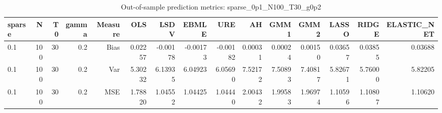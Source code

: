 \begin{table}[!htbp]\centering
\caption{Out-of-sample prediction metrics: sparse_0p1_N100_T30_g0p2}
\label{tab:table3_sparse_0p1_N100_T30_g0p2}
\begin{tabular}{lrrrrrrrrrrrrrr}
\hline
sparse & N & T0 & gamma & Measure & OLS & LSDV & EBMLE & URE & AH & GMM1 & GMM2 & LASSO & RIDGE & ELASTIC_NET \\
\hline
0.1 & 100 & 30 & 0.2 & Bias & 0.02257 & -0.00178 & -0.00173 & -0.00182 & 0.00031 & 0.00024 & 0.00150 & 0.03657 & 0.03855 & 0.03688 \\
0.1 & 100 & 30 & 0.2 & Var & 5.30232 & 6.13935 & 6.04923 & 6.05690 & 7.52172 & 7.50893 & 7.40817 & 5.82671 & 5.76000 & 5.82205 \\
0.1 & 100 & 30 & 0.2 & MSE & 1.78820 & 1.04552 & 1.04425 & 1.04440 & 2.00432 & 1.99583 & 1.96974 & 1.10596 & 1.10807 & 1.10620 \\
\hline
\end{tabular}
\end{table}

